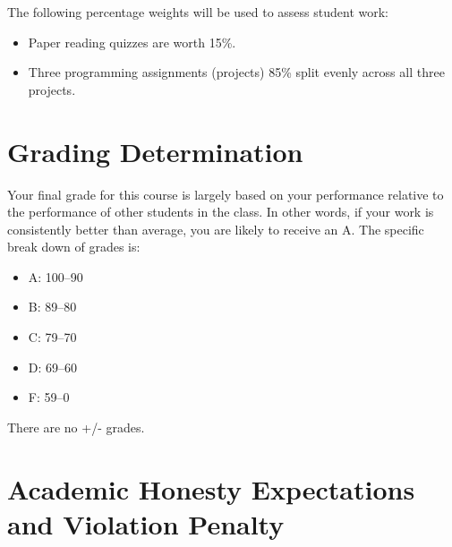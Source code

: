 \documentclass[11pt,article,oneside]{memoir} %
\begin{document}
The following percentage weights will be used to assess student work:

\begin{itemize}
    \item Paper reading quizzes are worth 15\%.
    \item Three programming assignments (projects) 85\% split evenly across all three projects.
\end{itemize}



\section{Grading Determination}\label{sec:grading_tentative_}%

Your final grade for this course is largely based on your performance relative to the performance
of other students in the class. In other words, if your work is consistently better than average, you
are likely to receive an A.
The specific break down of grades is:

\begin{itemize}
    \item A: 100--90
    \item B: 89--80
    \item C: 79--70
    \item D: 69--60
    \item F: 59--0
\end{itemize}

There are no +/- grades.

\section{Academic Honesty Expectations and Violation Penalty}
\end{document}
